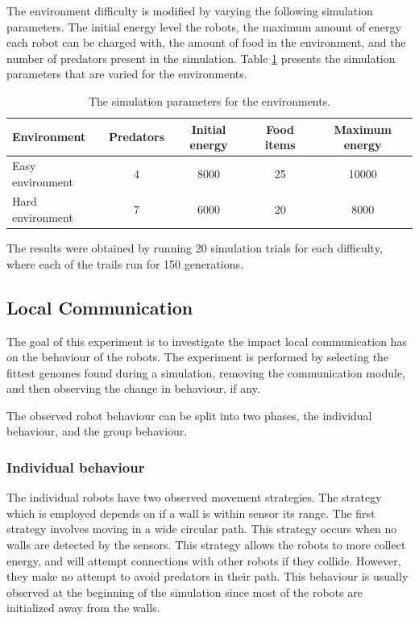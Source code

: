 The environment difficulty is modified by varying the following simulation parameters.
The initial energy level the robots, the maximum amount of energy each robot can be charged with, the amount of food in the environment, and the number of predators present in the simulation.
Table \ref{tab:environment-difficulty} presents the simulation parameters that are varied for the environments.

\begin{table}[H]
	\centering

	\begin{tabular}{@{} l c c c c @{}}
		\toprule 
		 Environment & \small{Predators} & \small{Initial energy} & \small{Food items} & \small{Maximum energy} \\ 
		\midrule 
		\small{Easy environment} & 4 & 8000 & 25 & 10000 \\ 
		\small{Hard environment} & 7 & 6000 & 20 &8000 \\ 
		\bottomrule 
		
	\end{tabular} 
	\caption{The simulation parameters for the environments.}
	\label{tab:environment-difficulty}
\end{table}

The results were obtained by running 20 simulation trials for each difficulty, where each of the trails run for 150 generations.

\newpage
\pagestyle{plain}



\newpage
\pagestyle{main}

\subsection{Local Communication}
\label{sec:local_communication}
The goal of this experiment is to investigate the impact local communication has on the behaviour of the robots.
The experiment is performed by selecting the fittest genomes found during a simulation, removing the communication module, and then observing the change in behaviour, if any.

The observed robot behaviour can be split into two phases, the individual behaviour, and the group behaviour.

\subsubsection{Individual behaviour}
\label{sec:invdividual_behaviour}
The individual robots have two observed movement strategies.
The strategy which is employed depends on if a wall is within sensor its range.
The first strategy involves moving in a wide circular path.
This strategy occurs when no walls are detected by the sensors.
This strategy allows the robots to more collect energy, and will attempt connections with other robots if they collide.
However, they make no attempt to avoid predators in their path.
This behaviour is usually observed at the beginning of the simulation since most of the robots are initialized away from the walls.

